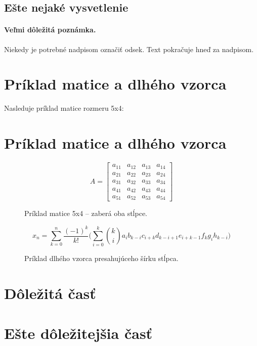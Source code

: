 \documentclass[10pt,twocolumn,twoside,slovak,a4paper]{article}
\begin{document}
\subsection{Ešte nejaké vysvetlenie} \label{ina:este}

\paragraph{Veľmi dôležitá poznámka.}
Niekedy je potrebné nadpisom označiť odsek. Text pokračuje hneď za nadpisom.

\section{Príklad matice a dlhého vzorca}

Nasleduje príklad matice rozmeru 5x4:

\section{Príklad matice a dlhého vzorca}

\begin{figure}[t!]
\[
A = 
\begin{bmatrix}
a_{11} & a_{12} & a_{13} & a_{14} \\
a_{21} & a_{22} & a_{23} & a_{24} \\
a_{31} & a_{32} & a_{33} & a_{34} \\
a_{41} & a_{42} & a_{43} & a_{44} \\
a_{51} & a_{52} & a_{53} & a_{54}
\end{bmatrix}
\]
\caption{Príklad matice 5x4 – zaberá oba stĺpce.}
\label{fig:matrix}
\end{figure}

\begin{figure}[t!]
\[
x_n = \sum_{k=0}^{n} \frac{(-1)^k}{k!} \Bigg( \sum_{i=0}^{k} \binom{k}{i} a_i b_{k-i} c_{i+k} d_{k-i+1} e_{i+k-1} f_{k} g_{i} h_{k-i} \Bigg)
\]
\caption{Príklad dlhého vzorca presahujúceho šírku stĺpca.}
\label{fig:long-formula}
\end{figure}


\section{Dôležitá časť} \label{dolezita}




\section{Ešte dôležitejšia časť} \label{dolezitejsia}
\end{document}
